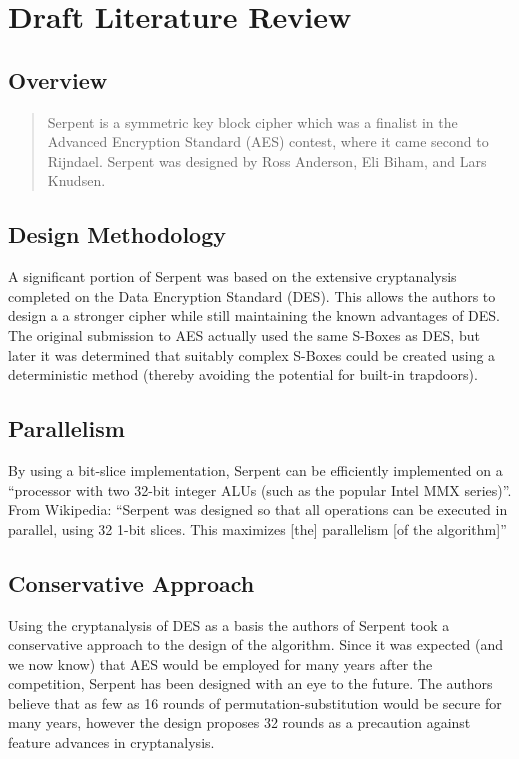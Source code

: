 \section{Draft Literature Review}

\subsection{Overview}

\blockquote{Serpent is a symmetric key block cipher which was a finalist in the Advanced Encryption Standard (AES) contest, where it came second to Rijndael. Serpent was designed by Ross Anderson, Eli Biham, and Lars Knudsen.}\cite{wikipedia}

\subsection{Design Methodology}

A significant portion of Serpent was based on the extensive cryptanalysis completed on the Data Encryption Standard (DES). \cite{submission} This allows the authors to design a a stronger cipher while still maintaining the known advantages of DES. The original submission to AES actually used the same S-Boxes as DES\cite[5]{submission}, but later it was determined that suitably complex S-Boxes could be created using a deterministic method (thereby avoiding the potential for built-in trapdoors). \cite[7, 15]{submission}

\subsection{Parallelism}

By using a bit-slice implementation, Serpent can be efficiently implemented on a \enquote{processor with two 32-bit integer ALUs (such as the popular Intel MMX series)}.\cite[2]{submission} From Wikipedia: \enquote{Serpent was designed so that all operations can be executed in parallel, using 32 1-bit slices. This maximizes [the] parallelism [of the algorithm]}\cite{wikipedia}

\subsection{Conservative Approach}

Using the cryptanalysis of DES as a basis the authors of Serpent took a conservative approach to the design of the algorithm.\cite{wikipedia} Since it was expected (and we now know) that AES would be employed for many years after the competition, Serpent has been designed with an eye to the future. The authors believe that as few as 16 rounds of permutation-substitution would be secure for many years, however the design proposes 32 rounds as a precaution against feature advances in cryptanalysis. \cite[4, 8]{submission}


